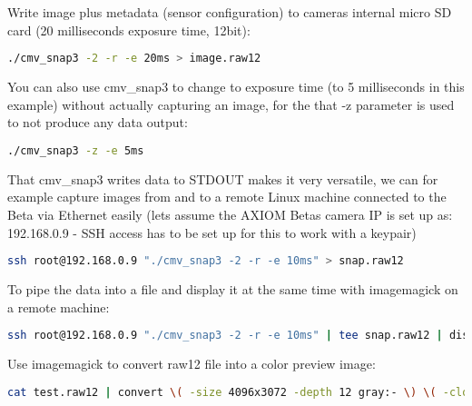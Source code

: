 Write image plus metadata (sensor configuration) to cameras internal micro SD card (20 milliseconds exposure time, 12bit): 

\begin{lstlisting}[language=bash,morekeywords=$,keywordstyle=\bfseries,frame=none,xleftmargin=.25in,belowskip=2em, aboveskip=2em]
./cmv_snap3 -2 -r -e 20ms > image.raw12
\end{lstlisting} 

You can also use cmv\_snap3 to change to exposure time (to 5 milliseconds in this example) without actually capturing an image, for the that -z parameter is used to not produce any data output: 

\begin{lstlisting}[language=bash,morekeywords=$,keywordstyle=\bfseries,frame=none,xleftmargin=.25in,belowskip=2em, aboveskip=2em]
./cmv_snap3 -z -e 5ms
\end{lstlisting} 

That cmv\_snap3 writes data to STDOUT makes it very versatile, we can for example capture images from and to a remote Linux machine connected to the Beta via Ethernet easily (lets assume the AXIOM Betas camera IP is set up as: 192.168.0.9 - SSH access has to be set up for this to work with a keypair) 

\begin{lstlisting}[language=bash,morekeywords=$,keywordstyle=\bfseries,frame=none,xleftmargin=.25in,belowskip=2em, aboveskip=2em]
ssh root@192.168.0.9 "./cmv_snap3 -2 -r -e 10ms" > snap.raw12
\end{lstlisting} 

To pipe the data into a file and display it at the same time with imagemagick on a remote machine: 

\begin{lstlisting}[language=bash,morekeywords=$,keywordstyle=\bfseries,frame=none,xleftmargin=.25in,belowskip=2em, aboveskip=2em]
    ssh root@192.168.0.9 "./cmv_snap3 -2 -r -e 10ms" | tee snap.raw12 | display -size 4096x3072 -depth 12 gray:-
\end{lstlisting} 

Use imagemagick to convert raw12 file into a color preview image: 

\begin{lstlisting}[language=bash,morekeywords=$,keywordstyle=\bfseries,frame=none,xleftmargin=.25in,belowskip=2em, aboveskip=2em]
cat test.raw12 | convert \( -size 4096x3072 -depth 12 gray:- \) \( -clone 0 -crop -1-1 \) \( -clone 0 -crop -1+0 \) \( -clone 0 -crop +0-1 \) -sample 2048x1536 \( -clone 2,3 -average \) -delete 2,3 -swap 0,1 +swap -combine test_color.png
\end{lstlisting} 


